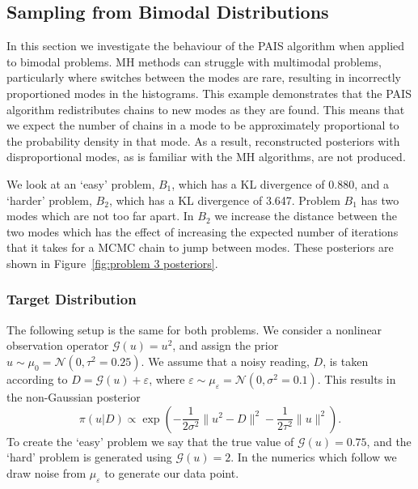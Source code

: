 \documentclass[final]{siamltex}
\newcommand{\G}{\mathcal{G}}
\newcommand{\N}{\mathcal{N}}
\begin{document}
\subsection{Sampling from Bimodal Distributions}

In this section we investigate the behaviour of the PAIS algorithm
when applied to bimodal problems. MH methods can
struggle with multimodal problems, particularly where switches between
the modes are rare, resulting in incorrectly proportioned modes in the
histograms. This example demonstrates that the PAIS algorithm redistributes 
chains to new modes as they are found. This means that we expect the number of chains in a mode to be
approximately proportional to the probability density in that mode. As a result, reconstructed posteriors with disproportional modes, as is familiar with the MH algorithms, are not produced.

We look at an `easy' problem, $B_1$, which has a KL divergence of
0.880, and a `harder' problem, $B_2$, which has a KL divergence of
3.647. Problem $B_1$ has two modes which are not too far apart. In
$B_2$ we increase the distance between the two modes which has the
effect of increasing the expected number of iterations that it takes
for a MCMC chain to jump between modes. These posteriors are shown in Figure~\ref{fig:problem 3 posteriors}.

\subsubsection{Target Distribution} \label{sec:tar}

The following setup is the same for both problems. We consider a nonlinear observation operator $\G(u) = u^2$, and assign the prior $u \sim \mu_0 = \N(0, \tau^2=0.25)$. We assume that a noisy reading, $D$, is taken according to $D = \G(u) + \varepsilon$, where $\varepsilon \sim \mu_\varepsilon = \N(0, \sigma^2 = 0.1)$. This results in the non-Gaussian posterior
\[
	\pi(u|D) \propto \exp\left(-\frac{1}{2\sigma^2}\|u^2 - D\|^2 - \frac{1}{2\tau^2}\|u\|^2\right).
\]
To create the `easy' problem we say that the true value of $\G(u) = 0.75$, and the `hard' problem is generated using $\G(u) = 2$. In the numerics which follow we draw noise from $\mu_\varepsilon$ to generate our data point.
\end{document}
